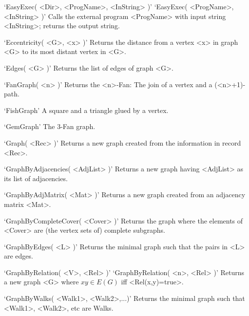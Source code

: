 `EasyExec( <Dir>, <ProgName>, <InString> )'\newline
`EasyExec( <ProgName>, <InString> )'\newline\hglue 5mm 
Calls the external program <ProgName> with input string <InString>; returns the output string.

`Eccentricity( <G>, <x> )'\newline\hglue 5mm 
Returns  the  distance  from a vertex <x> in graph <G> to its most distant vertex in <G>.

`Edges( <G> )'\newline\hglue 5mm 
Returns the list of edges of graph <G>.

`FanGraph( <n> )'\newline\hglue 5mm 
Returns the <n>-Fan: The join of a vertex and a (<n>+1)-path.

`FishGraph'\newline\hglue 5mm 
A square and a triangle glued by a vertex.

`GemGraph'\newline\hglue 5mm 
The 3-Fan graph.

`Graph( <Rec> )'\newline\hglue 5mm 
Returns  a  new  graph  created  from  the  information in record  <Rec>.

`GraphByAdjacencies( <AdjList> )'\newline\hglue 5mm 
Returns  a  new  graph  having  <AdjList>  as its list of adjacencies.

`GraphByAdjMatrix( <Mat> )'\newline\hglue 5mm 
Returns  a  new  graph  created from an adjacency matrix <Mat>.

`GraphByCompleteCover( <Cover> )'\newline\hglue 5mm 
Returns the graph where the elements of <Cover> are (the vertex sets of) complete subgraphs.

`GraphByEdges( <L> )'\newline\hglue 5mm 
Returns the minimal graph such that the pairs in <L> are edges.

`GraphByRelation( <V>, <Rel> )'\newline
`GraphByRelation( <n>, <Rel> )'\newline\hglue 5mm 
Returns  a  new  graph  <G> where $xy \in E(G)$ iff <Rel(x,y)=true>.

`GraphByWalks( <Walk1>, <Walk2>,...)'\newline\hglue 5mm 
Returns the minimal graph such that <Walk1>, <Walk2>, etc are Walks.


